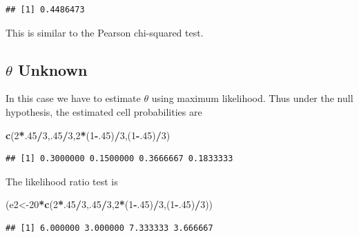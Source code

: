 \documentclass[]{book}
\newenvironment{Shaded}{\begin{snugshade}}{\end{snugshade}}
\newcommand{\KeywordTok}[1]{\textcolor[rgb]{0.13,0.29,0.53}{\textbf{#1}}}
\newcommand{\DecValTok}[1]{\textcolor[rgb]{0.00,0.00,0.81}{#1}}
\newcommand{\OperatorTok}[1]{\textcolor[rgb]{0.81,0.36,0.00}{\textbf{#1}}}
\newcommand{\NormalTok}[1]{#1}
\theoremstyle{definition}
\theoremstyle{definition}
\theoremstyle{definition}
\theoremstyle{remark}
\begin{document}
\begin{verbatim}
## [1] 0.4486473
\end{verbatim}

This is similar to the Pearson chi-squared test.

\subsection{\texorpdfstring{\(\theta\)
Unknown}{\textbackslash{}theta Unknown}}\label{theta-unknown}

In this case we have to estimate \(\theta\) using maximum likelihood.
Thus under the null hypothesis, the estimated cell probabilities are

\begin{Shaded}
\begin{Highlighting}[]
\KeywordTok{c}\NormalTok{(}\DecValTok{2}\OperatorTok{*}\NormalTok{.}\DecValTok{45}\OperatorTok{/}\DecValTok{3}\NormalTok{,.}\DecValTok{45}\OperatorTok{/}\DecValTok{3}\NormalTok{,}\DecValTok{2}\OperatorTok{*}\NormalTok{(}\DecValTok{1}\OperatorTok{-}\NormalTok{.}\DecValTok{45}\NormalTok{)}\OperatorTok{/}\DecValTok{3}\NormalTok{,(}\DecValTok{1}\OperatorTok{-}\NormalTok{.}\DecValTok{45}\NormalTok{)}\OperatorTok{/}\DecValTok{3}\NormalTok{)}
\end{Highlighting}
\end{Shaded}

\begin{verbatim}
## [1] 0.3000000 0.1500000 0.3666667 0.1833333
\end{verbatim}

The likelihood ratio test is

\begin{Shaded}
\begin{Highlighting}[]
\NormalTok{(e2<-}\DecValTok{20}\OperatorTok{*}\KeywordTok{c}\NormalTok{(}\DecValTok{2}\OperatorTok{*}\NormalTok{.}\DecValTok{45}\OperatorTok{/}\DecValTok{3}\NormalTok{,.}\DecValTok{45}\OperatorTok{/}\DecValTok{3}\NormalTok{,}\DecValTok{2}\OperatorTok{*}\NormalTok{(}\DecValTok{1}\OperatorTok{-}\NormalTok{.}\DecValTok{45}\NormalTok{)}\OperatorTok{/}\DecValTok{3}\NormalTok{,(}\DecValTok{1}\OperatorTok{-}\NormalTok{.}\DecValTok{45}\NormalTok{)}\OperatorTok{/}\DecValTok{3}\NormalTok{))}
\end{Highlighting}
\end{Shaded}

\begin{verbatim}
## [1] 6.000000 3.000000 7.333333 3.666667
\end{verbatim}
\end{document}
